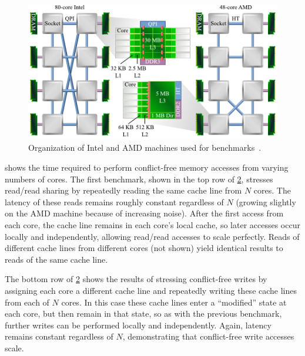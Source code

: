 \begin{figure}
  \centering
  \includegraphics{figures/machines.pdf}
  \caption[Organization of benchmark machines.]{Organization of Intel
    and AMD machines used for
    benchmarks~\cite{ben-motherboard,tom-motherboard-1,tom-motherboard-2}.}
  \label{fig:machines}
\end{figure}


\begin{figure}
  \centering
  \label{fig:cfree-cycles}
\end{figure}

 shows the time required to perform
conflict-free memory accesses from varying numbers of cores.  The
first benchmark, shown in the top row of \cref{fig:cfree-cycles},
stresses read/read sharing by repeatedly reading the same cache line
from $N$ cores.  The latency of these reads remains roughly constant
regardless of $N$ (growing slightly on the AMD machine because of
increasing noise).  After the first access from each core, the cache
line remains in each core's local cache, so later accesses occur
locally and independently, allowing read/read accesses to scale
perfectly.  Reads of different cache lines from different cores (not
shown) yield identical results to reads of the same cache line.

The bottom row of \cref{fig:cfree-cycles} shows the results of
stressing conflict-free writes by assigning each core a different
cache line and repeatedly writing these cache lines from each of $N$
cores.  In this case these cache lines enter a ``modified'' state at
each core, but then remain in that state, so as with the previous
benchmark, further writes can be performed locally and independently.
%
Again, latency remains constant regardless of $N$, demonstrating that
conflict-free write accesses scale.

